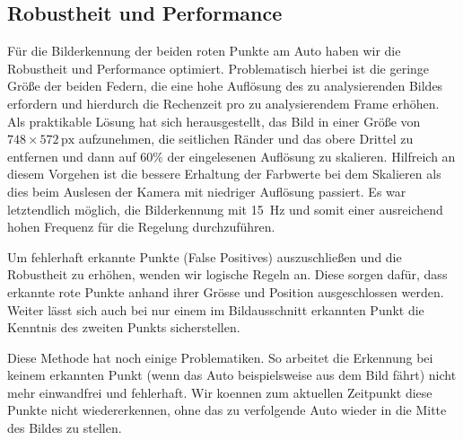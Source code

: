 \documentclass[10pt]{article}
\begin{document}
    \subsection{Robustheit und Performance} %
    \label{sub:robustheit_und_performance}
        Für die Bilderkennung der beiden roten Punkte am Auto haben wir die Robustheit und Performance optimiert.
        Problematisch hierbei ist die geringe Größe der beiden Federn, die eine hohe Auflösung des zu analysierenden Bildes erfordern und hierdurch die Rechenzeit pro zu analysierendem Frame erhöhen.
        Als praktikable Lösung hat sich herausgestellt, das Bild in einer Größe von $748\times 572\,\text{px}$ aufzunehmen, die seitlichen Ränder und das obere Drittel zu entfernen und dann auf $60\%$ der eingelesenen Auflösung zu skalieren.
        Hilfreich an diesem Vorgehen ist die bessere Erhaltung der Farbwerte bei dem Skalieren als dies beim Auslesen der Kamera mit niedriger Auflösung passiert.
        Es war letztendlich möglich, die Bilderkennung mit \SI{15}{\hertz} und somit einer ausreichend hohen Frequenz für die Regelung durchzuführen.

        Um fehlerhaft erkannte Punkte (False Positives) auszuschließen und die Robustheit zu erhöhen, wenden wir logische Regeln an.
        Diese sorgen dafür, dass erkannte rote Punkte anhand ihrer Grösse und Position ausgeschlossen werden.
        Weiter lässt sich auch bei nur einem im Bildausschnitt erkannten Punkt die Kenntnis des zweiten Punkts sicherstellen.

        Diese Methode hat noch einige Problematiken.
        So arbeitet die Erkennung bei keinem erkannten Punkt (wenn das Auto beispielsweise \glqq aus dem Bild fährt\grqq ) nicht mehr einwandfrei und fehlerhaft.
        Wir koennen zum aktuellen Zeitpunkt diese Punkte nicht wiedererkennen, ohne das zu verfolgende Auto wieder in die Mitte des Bildes zu stellen.
\end{document}
